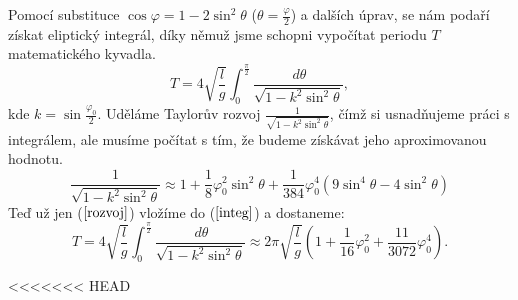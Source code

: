 Pomocí substituce $\cos\varphi=1-2\sin^2\theta$ ($\theta=\frac{\varphi}{2}$) a dalších úprav, se nám podaří získat eliptický integrál, díky němuž jsme schopni vypočítat periodu $T$ matematického kyvadla.
\begin{equation}
\label{integ}
T=4\sqrt{\frac{l}{g}}\int_{0}^{\frac{\pi}{2}}\frac{\,d\theta}{\sqrt{1-k^2\sin^2\theta}},
\end{equation}
kde $k=\sin\frac{\varphi_0}{2}$.
Uděláme Taylorův rozvoj $\frac{1}{\sqrt{1-k^2\sin^2\theta}}$, čímž si usnadňujeme práci s integrálem, ale musíme počítat s tím, že budeme získávat jeho aproximovanou hodnotu.
\begin{equation}
\label{rozvoj}
\frac{1}{\sqrt{1-k^2\sin^2\theta}}\approx1+\frac{1}{8} \varphi_0 ^2 \sin ^2\theta+\frac{1}{384} \varphi_0 ^4 \left(9 \sin ^4\theta-4 \sin
   ^2\theta \right)
\end{equation}
Teď už jen ($\ref{rozvoj}$) vložíme do ($\ref{integ}$) a dostaneme:
\begin{equation}
T=4\sqrt{\frac{l}{g}}\int_{0}^{\frac{\pi}{2}}\frac{\,d\theta}{\sqrt{1-k^2\sin^2\theta}}\approx2\pi\sqrt{\frac{l}{g}}\left(1+\frac{1}{16}\varphi_0^2+\frac{11}{3072}\varphi_0^4\right).
\end{equation}

<<<<<<< HEAD
